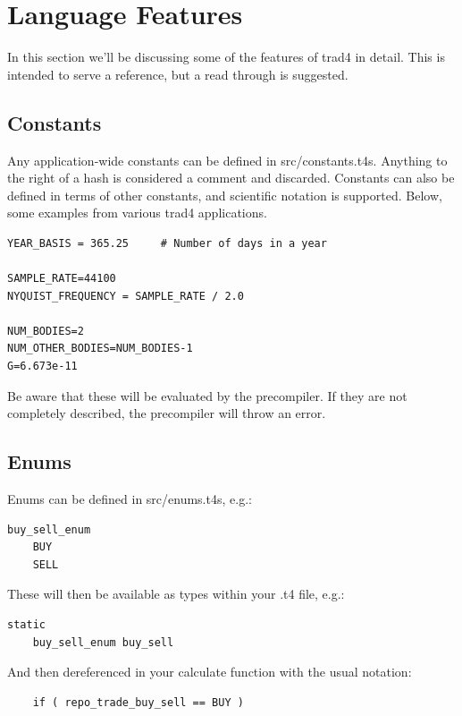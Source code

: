 \documentclass{report}
\begin{document}
\chapter{Language Features}
\label{sec:Language Features}


In this section we'll be discussing some of the features of trad4 in detail. This is intended to serve a reference, but a read through is suggested.

\section{Constants}

Any application-wide constants can be defined in src/constants.t4s. Anything to the right of a hash is considered a comment and discarded. Constants can also be defined in terms of other constants, and scientific notation is supported. Below, some examples from various trad4 applications.

\begin{verbatim}
YEAR_BASIS = 365.25     # Number of days in a year

SAMPLE_RATE=44100
NYQUIST_FREQUENCY = SAMPLE_RATE / 2.0

NUM_BODIES=2
NUM_OTHER_BODIES=NUM_BODIES-1
G=6.673e-11

\end{verbatim}

Be aware that these will be evaluated by the precompiler. If they are not completely described, the precompiler will throw an error.

\section{Enums}


Enums can be defined in src/enums.t4s, e.g.:
\begin{verbatim}
buy_sell_enum
    BUY
    SELL
\end{verbatim}

These will then be available as types within your .t4 file, e.g.:

\begin{verbatim}
static
    buy_sell_enum buy_sell
\end{verbatim}


And then dereferenced in your calculate function with the usual notation:
\begin{verbatim}
    if ( repo_trade_buy_sell == BUY ) 
\end{verbatim}
\end{document}
